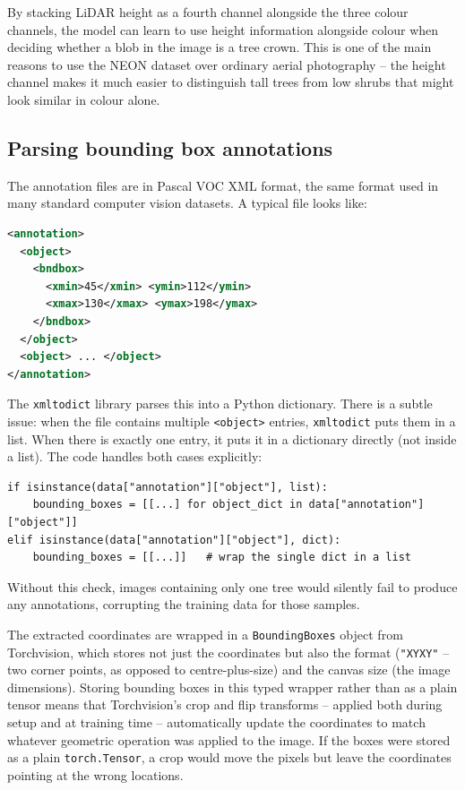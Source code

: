 \documentclass[11pt, a4paper]{article}
\begin{document}
By stacking LiDAR height as a fourth channel alongside the three colour
channels, the model can learn to use height information alongside colour when
deciding whether a blob in the image is a tree crown. This is one of the main
reasons to use the NEON dataset over ordinary aerial photography -- the height
channel makes it much easier to distinguish tall trees from low shrubs that
might look similar in colour alone.

\subsection{Parsing bounding box annotations}

The annotation files are in Pascal VOC XML format, the same format used in
many standard computer vision datasets. A typical file looks like:

\begin{lstlisting}[language=XML]
<annotation>
  <object>
    <bndbox>
      <xmin>45</xmin> <ymin>112</ymin>
      <xmax>130</xmax> <ymax>198</ymax>
    </bndbox>
  </object>
  <object> ... </object>
</annotation>
\end{lstlisting}

The \texttt{xmltodict} library parses this into a Python dictionary. There is
a subtle issue: when the file contains multiple \texttt{<object>} entries,
\texttt{xmltodict} puts them in a list. When there is exactly one entry, it
puts it in a dictionary directly (not inside a list). The code handles both
cases explicitly:

\begin{lstlisting}
if isinstance(data["annotation"]["object"], list):
    bounding_boxes = [[...] for object_dict in data["annotation"]["object"]]
elif isinstance(data["annotation"]["object"], dict):
    bounding_boxes = [[...]]   # wrap the single dict in a list
\end{lstlisting}

Without this check, images containing only one tree would silently fail to
produce any annotations, corrupting the training data for those samples.

The extracted coordinates are wrapped in a \texttt{BoundingBoxes} object from
Torchvision, which stores not just the coordinates but also the format
(\texttt{"XYXY"} -- two corner points, as opposed to centre-plus-size) and
the canvas size (the image dimensions). Storing bounding boxes in this typed
wrapper rather than as a plain tensor means that Torchvision's crop and flip
transforms -- applied both during setup and at training time -- automatically
update the coordinates to match whatever geometric operation was applied to the
image. If the boxes were stored as a plain \texttt{torch.Tensor}, a crop would
move the pixels but leave the coordinates pointing at the wrong locations.
\end{document}
